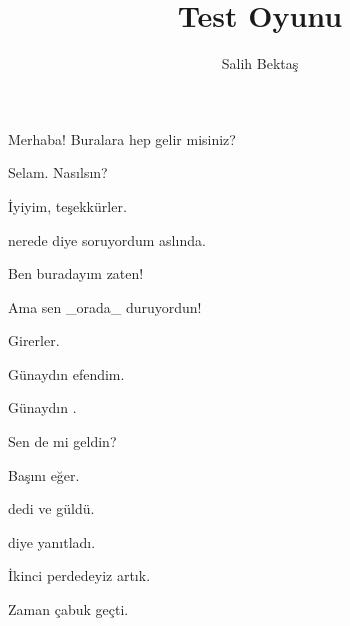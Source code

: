 \documentclass[draft]{tiyatro}
\title{Test Oyunu}
\author{Salih Bektaş}
\begin{document}
\maketitle      %
\kisiler        %
\pagebreak





\mu Merhaba! Buralara hep gelir misiniz?

\ma Selam.  Nasılsın?

\mu İyiyim, teşekkürler.

\mu \ma nerede diye soruyordum aslında.

\ma Ben buradayım zaten!

\mu Ama sen _orada_ duruyordun!


\mudo\mado\mustdo Girerler.

\must Günaydın efendim.

\mu Günaydın \must.

\ma {} Sen de mi geldin?

\mustdo Başını eğer.

\mu {} dedi ve güldü.

\ma {} diye yanıtladı.



\sahne[]

\mu İkinci perdedeyiz artık.

\ma Zaman çabuk geçti.
\end{document}
